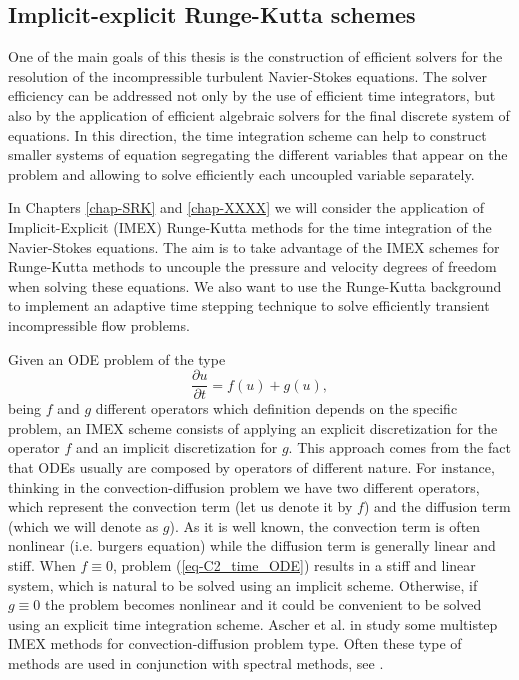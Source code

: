 \subsection{Implicit-explicit Runge-Kutta schemes}
One of the main goals of this thesis is the construction of efficient solvers for the resolution of the incompressible turbulent Navier-Stokes equations. The solver efficiency can be addressed not only by the use of efficient time integrators, but also by the application of efficient algebraic solvers for the final discrete system of equations. In this direction, the time integration scheme can help to construct smaller systems of equation segregating the different variables that appear on the problem and allowing to solve efficiently each uncoupled variable separately.

In Chapters \ref{chap-SRK} and \ref{chap-XXXX} we will consider the application of Implicit-Explicit (IMEX) Runge-Kutta methods for the time integration of the Navier-Stokes equations. The aim is to take advantage of the IMEX schemes for Runge-Kutta methods to uncouple the pressure and velocity degrees of freedom when solving these equations. We also want to use the Runge-Kutta background to implement an adaptive time stepping technique to solve efficiently transient incompressible flow problems.

Given an ODE problem of the type
\begin{equation}
\label{eq-C2_time_ODE}
\frac{\partial u}{\partial t}=f(u)+g(u), 
\end{equation}
being $f$ and $g$ different operators which definition depends on the specific problem, an IMEX scheme consists of applying an explicit discretization for the operator $f$ and an implicit discretization for $g$. This approach comes from the fact that ODEs usually are composed by operators of different nature. For instance, thinking in the convection-diffusion problem we have two different operators, which represent the convection term (let us denote it by $f$) and the diffusion term (which we will denote as $g$). As it is well known, the convection term is often nonlinear (i.e. burgers equation) while the diffusion term is generally linear and stiff. When $f\equiv0$, problem (\ref{eq-C2_time_ODE}) results in a stiff and linear system, which is natural to be solved using an implicit scheme. Otherwise, if $g\equiv0$ the problem becomes nonlinear and it could be convenient to be solved using an explicit time integration scheme. Ascher et al. in \cite{ascher_implicit-explicit_1995} study some multistep IMEX methods for convection-diffusion problem type. Often these type of methods are used in conjunction with spectral methods, see \cite{canuto_spectral_1988, kim_application_1985}.

